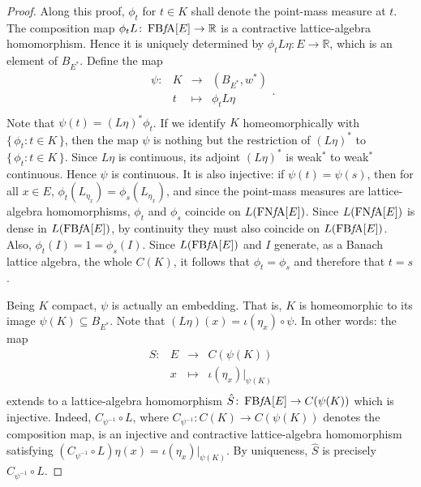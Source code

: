 \documentclass{memo-l}
\theoremstyle{definition}
\theoremstyle{remark}
\numberwithin{section}{chapter}
\numberwithin{equation}{chapter}
\newcommand\R{\ensuremath{\mathbb{R}}}
\newcommand{\FNFA}[1]{\operatorname{FN{\it f}\!A}[#1]}
\newcommand{\FBFA}[1]{\operatorname{FB{\it f}\!A}[#1]}
\begin{document}
\begin{proof}
    Along this proof, $\phi _t$ for $t \in K$ shall denote the
    point-mass measure at $t$. The composition map $\phi _tL\colon
    \FBFA E\to \R$ is a contractive lattice-algebra homomorphism.
    Hence it is uniquely determined by $\phi _tL\eta \colon E\to \R$,
    which is an element of $B_{E^{*}}$. Define the map
    \[
    \begin{array}{cccc}
    \psi \colon& K & \longrightarrow & (B_{E^{*}},w^{*}) \\
            & t & \longmapsto & \phi _tL\eta  \\
    \end{array}.
    \]
    Note that $\psi (t)=(L \eta
    )^{*}\phi _t$. If
    we identify $K$ homeomorphically with $\{\, \phi _t : t \in K \,
    \} $, then the map $\psi $ is nothing but the restriction of
    $(L\eta )^{*}$ to $\{\, \phi _t : t \in K \, \} $. Since $L \eta $
    is continuous, its adjoint $(L\eta )^{*}$ is weak$^*$ to weak$^*$
    continuous. Hence $\psi $ is continuous.
    It is also injective: if $\psi (t)=\psi (s)$, then for
    all $x \in E$, $\phi _t(L_{\eta _x})=\phi _s(L_{\eta _x})$, and
    since the point-mass measures are lattice-algebra homomorphisms,
    $\phi _t$ and $\phi _s$ coincide on $L(\FNFA E)$. Since
    $L(\FNFA E)$ is dense in $L(\FBFA E)$, by continuity they must
    also coincide on $L(\FBFA E)$. Also, $\phi _t(I)=1=\phi
    _s(I)$. Since $L(\FBFA E)$ and $I$ generate, as a Banach lattice
    algebra, the whole $C(K)$, it follows that $\phi _t=\phi _s$ and
    therefore that $t=s$.

    Being $K$ compact, $\psi $ is actually an embedding. That is, $K$
    is homeomorphic to its image $\psi (K)\subseteq B_{E^{*}}$.
    Note that $(L \eta )(x)=\iota (\eta _x)\circ \psi $. In other
    words: the map
    \[
    \begin{array}{cccc}
    S\colon&  E & \longrightarrow & C(\psi (K)) \\
            & x & \longmapsto & \iota (\eta _x)|_{\psi (K)} \\
    \end{array}
    \]
    extends to a lattice-algebra homomorphism $\hat{S}\colon \FBFA
    E\to C(\psi (K))$ which is injective. Indeed, $C_{\psi ^{-1}}\circ L$, where $C_{\psi
    ^{-1}}\colon C(K)\to C(\psi (K))$ denotes the composition
    map, is an injective and contractive lattice-algebra homomorphism satisfying
    $(C_{\psi ^{-1}}\circ L)\eta(x)=\iota (\eta _x)|_{\psi (K)}$. By
    uniqueness, $\hat{S}$ is precisely $C_{\psi ^{-1}}\circ L$.


\end{proof}
\end{document}
